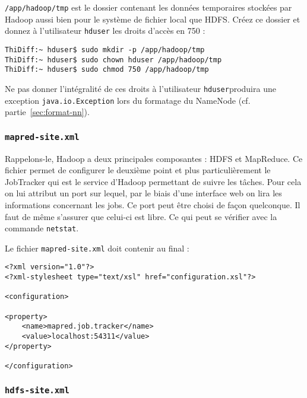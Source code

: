 \par \texttt{/app/hadoop/tmp} est le dossier contenant les données temporaires stockées par Hadoop aussi bien pour le système de fichier local que HDFS. Créez ce dossier et donnez à l'utilisateur \texttt{hduser} les droits d'accès en 750 :

\begin{verbatim}
ThiDiff:~ hduser$ sudo mkdir -p /app/hadoop/tmp
ThiDiff:~ hduser$ sudo chown hduser /app/hadoop/tmp
ThiDiff:~ hduser$ sudo chmod 750 /app/hadoop/tmp
\end{verbatim}

\par Ne pas donner l'intégralité de ces droits à l'utilisateur \texttt{hduser}produira une exception \texttt{java.io.Exception} lors du formatage du NameNode (cf. partie~\ref{sec:format-nn}).

\subsubsection{\texttt{mapred-site.xml}}
\label{sec:mapred-site.xml}

\par Rappelons-le, Hadoop a deux principales composantes : HDFS et MapReduce. Ce fichier permet de configurer le deuxième point et plus particulièrement le JobTracker qui est le service d'Hadoop permettant de suivre les tâches. Pour cela on lui attribut un port sur lequel, par le biais d'une interface web on lira les informations concernant les jobs. Ce port peut être choisi de façon quelconque. Il faut de même s'assurer que celui-ci est libre. Ce qui peut se vérifier avec la commande \texttt{netstat}.

\par Le fichier \texttt{mapred-site.xml} doit contenir au final :

\begin{verbatim}
<?xml version="1.0"?>
<?xml-stylesheet type="text/xsl" href="configuration.xsl"?>

<configuration>

<property>
	<name>mapred.job.tracker</name>
    <value>localhost:54311</value>
</property>

</configuration>
\end{verbatim}

\subsubsection{\texttt{hdfs-site.xml}}
\label{sec:hdfs-site.xml}

